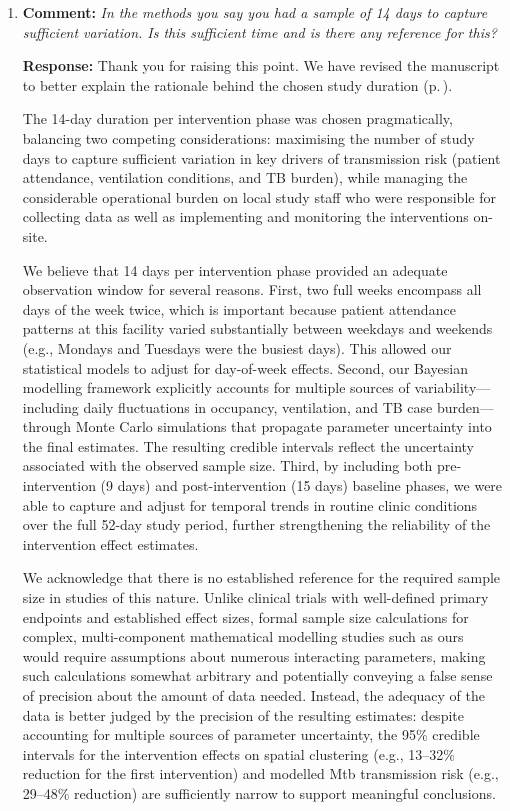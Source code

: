 \documentclass[11pt]{article}
\newcommand{\comment}[1]{\textbf{Comment:} \textit{#1}}
\newcommand{\response}[1]{\textbf{Response:} #1}
\begin{document}
\begin{enumerate}[label=\textbf{R1.\arabic*.}, leftmargin=*]

\item\label{r:1.1} \comment{In the methods you say you had a sample of 14 days to capture sufficient variation. Is this sufficient time and is there any reference for this?}

\response{Thank you for raising this point. We have revised the manuscript to better explain the rationale behind the chosen study duration (p.\,\pageref{chg:R1.1}).

The 14-day duration per intervention phase was chosen pragmatically, balancing two competing considerations: maximising the number of study days to capture sufficient variation in key drivers of transmission risk (patient attendance, ventilation conditions, and TB burden), while managing the considerable operational burden on local study staff who were responsible for collecting data as well as implementing and monitoring the interventions on-site.

We believe that 14 days per intervention phase provided an adequate observation window for several reasons. First, two full weeks encompass all days of the week twice, which is important because patient attendance patterns at this facility varied substantially between weekdays and weekends (e.g., Mondays and Tuesdays were the busiest days). This allowed our statistical models to adjust for day-of-week effects. Second, our Bayesian modelling framework explicitly accounts for multiple sources of variability---including daily fluctuations in occupancy, ventilation, and TB case burden---through Monte Carlo simulations that propagate parameter uncertainty into the final estimates. The resulting credible intervals reflect the uncertainty associated with the observed sample size. Third, by including both pre-intervention (9 days) and post-intervention (15 days) baseline phases, we were able to capture and adjust for temporal trends in routine clinic conditions over the full 52-day study period, further strengthening the reliability of the intervention effect estimates.

We acknowledge that there is no established reference for the required sample size in studies of this nature. Unlike clinical trials with well-defined primary endpoints and established effect sizes, formal sample size calculations for complex, multi-component mathematical modelling studies such as ours would require assumptions about numerous interacting parameters, making such calculations somewhat arbitrary and potentially conveying a false sense of precision about the amount of data needed. Instead, the adequacy of the data is better judged by the precision of the resulting estimates: despite accounting for multiple sources of parameter uncertainty, the 95\% credible intervals for the intervention effects on spatial clustering (e.g., 13--32\% reduction for the first intervention) and modelled Mtb transmission risk (e.g., 29--48\% reduction) are sufficiently narrow to support meaningful conclusions.}


\end{enumerate}
\end{document}
